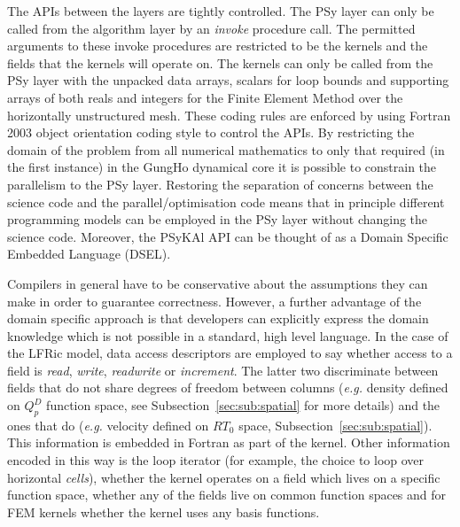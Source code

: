\documentclass[times]{elsarticle}
\begin{document}
The APIs between the layers are tightly controlled. The PSy layer can
only be called from the algorithm layer by an {\em invoke} procedure
call. The permitted arguments to these invoke procedures are restricted
to be the kernels and the fields that the kernels will operate on. The
kernels can only be called from the PSy layer with the unpacked data
arrays, scalars for loop bounds and supporting arrays of both reals
and integers for the Finite Element Method over the horizontally unstructured mesh.
These coding rules are enforced by using Fortran 2003 object
orientation coding style to control the APIs. By restricting the
domain of the problem from all numerical mathematics to only that
required (in the first instance) in the GungHo dynamical core it is
possible to constrain the parallelism to the PSy layer. Restoring
the separation of concerns between the science code and the
parallel/optimisation code means that in principle different programming
models can be employed in the PSy layer without changing the science
code. Moreover, the PSyKAl API can be thought of as a Domain Specific
Embedded Language (DSEL).

Compilers in general have to be conservative about the assumptions
they can make in order to guarantee correctness. However, a further
advantage of the domain specific approach is that developers can
explicitly express the domain knowledge which is not possible in a
standard, high level language. In the case of the LFRic model, data
access descriptors are employed to say whether access to a field is
{\em read}, {\em write}, {\em readwrite} or {\em increment}. The latter 
two discriminate between fields that do not share degrees 
of freedom between columns ({\em e.g.} density defined on 
$Q_p^D$ function space, see Subsection~\ref{sec:sub:spatial} for more details) 
and the ones that do ({\em e.g.} velocity defined on $RT_0$ space, 
Subsection~\ref{sec:sub:spatial}). This information is embedded in
Fortran as part of the kernel. Other information encoded in this way
is the loop iterator (for example, the choice to loop over horizontal {\em cells}), whether the kernel
operates on a field which lives on a specific function space, whether
any of the fields live on common function spaces and for FEM kernels
whether the kernel uses any basis functions. 
\end{document}
